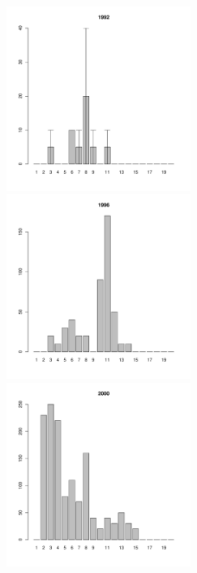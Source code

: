 \begin{figure}[h]

\begin{multicols}{3}
\hfill
\includegraphics[width=60mm]{../White_Sea/Luvenga_Goreliy/midlow_1992_.pdf}
\hfill
\includegraphics[width=60mm]{../White_Sea/Luvenga_Goreliy/midlow_1996_.pdf}
\hfill
\includegraphics[width=60mm]{../White_Sea/Luvenga_Goreliy/midlow_2000_.pdf}
\end{multicols}




\end{figure}
